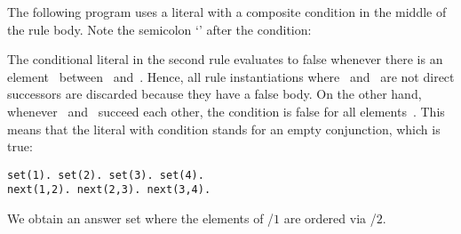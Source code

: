 \begin{example}\label{ex:sort}
The following program uses a literal with a composite condition in the middle of the rule body.
Note the semicolon `\code{;}' after the condition:
%

%
The conditional literal in the second rule evaluates to false
whenever there is an element~ between~ and~.
Hence, all rule instantiations where~ and~ are not direct successors are discarded
because they have a false body.
On the other hand, whenever~ and~ succeed each other,
the condition is false for all elements~.
This means that the literal with condition stands for an empty conjunction, which is true:%
%
\begin{lstlisting}[numbers=none]
set(1). set(2). set(3). set(4).
next(1,2). next(2,3). next(3,4).
\end{lstlisting}
We obtain an answer set where the elements of /$1$ are ordered via /$2$.
\end{example}

